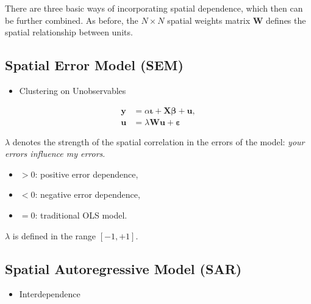 \documentclass[
  letterpaper,
  DIV=11,
  numbers=noendperiod]{scrreprt}
\providecommand{\tightlist}{%
  \setlength{\itemsep}{0pt}\setlength{\parskip}{0pt}}\usepackage{longtable,booktabs,array}
\begin{document}
There are three basic ways of incorporating spatial dependence, which
then can be further combined. As before, the \(N \times N\) spatial
weights matrix \(\boldsymbol{\mathbf{W}}\) defines the spatial
relationship between units.

\hypertarget{spatial-error-model-sem}{%
\subsection{Spatial Error Model (SEM)}\label{spatial-error-model-sem}}

\begin{itemize}
\tightlist
\item
  Clustering on Unobservables
\end{itemize}

\[
        \begin{equation} 
        \begin{split}
        {\boldsymbol{\mathbf{y}}}&=\alpha{\boldsymbol{\mathbf{\iota}}}+{\boldsymbol{\mathbf{X}}}{\boldsymbol{\mathbf{\beta}}}+{\boldsymbol{\mathbf{u}}},\\
        {\boldsymbol{\mathbf{u}}}&=\lambda{\boldsymbol{\mathbf{W}}}{\boldsymbol{\mathbf{u}}}+{\boldsymbol{\mathbf{\varepsilon}}}
        \end{split} 
        \end{equation}
\]

\(\lambda\) denotes the strength of the spatial correlation in the
errors of the model: \emph{your errors influence my errors}.

\begin{itemize}
\tightlist
\item
  \(> 0\): positive error dependence,
\item
  \(< 0\): negative error dependence,
\item
  \(= 0\): traditional OLS model.
\end{itemize}

\(\lambda\) is defined in the range \([-1, +1]\).

\hypertarget{spatial-autoregressive-model-sar}{%
\subsection{Spatial Autoregressive Model
(SAR)}\label{spatial-autoregressive-model-sar}}

\begin{itemize}
\tightlist
\item
  Interdependence
\end{itemize}
\end{document}
